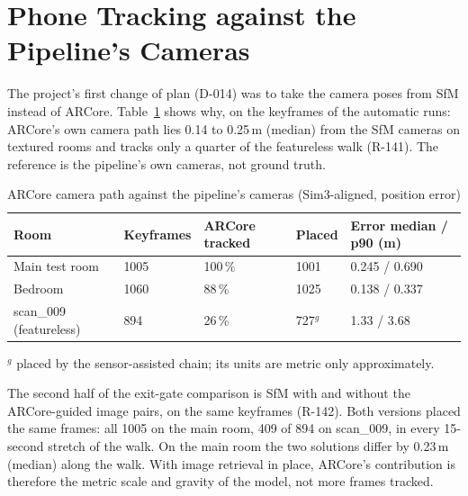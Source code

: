 \section{Phone Tracking against the Pipeline's Cameras}
\label{sec:eval-arcore}
The project's first change of plan (D-014) was to take the camera poses from SfM instead of ARCore. Table~\ref{tab:eval-arcore}
shows why, on the keyframes of the automatic runs: ARCore's own camera path lies 0.14 to 0.25\,m (median) from the
SfM cameras on textured rooms and tracks only a quarter of the featureless walk (R-141). The reference is the
pipeline's own cameras, not ground truth.
\begin{table}[htbp]
\centering\small
\caption{ARCore camera path against the pipeline's cameras (Sim3-aligned, position error)}
\label{tab:eval-arcore}
\begin{tabular}{p{3.4cm}p{1.6cm}p{2.2cm}p{1.8cm}p{3.4cm}}
\toprule
\textbf{Room} & \textbf{Keyframes} & \textbf{ARCore tracked} & \textbf{Placed} & \textbf{Error median / p90 (m)} \\
\midrule
Main test room & 1005 & 100\,\% & 1001 & 0.245 / 0.690 \\
Bedroom & 1060 & 88\,\% & 1025 & 0.138 / 0.337 \\
scan\_009 (featureless) & 894 & 26\,\% & 727$^g$ & 1.33 / 3.68 \\
\bottomrule
\end{tabular}

\smallskip
\footnotesize $^g$ placed by the sensor-assisted chain; its units are metric only approximately.
\end{table}
The second half of the exit-gate comparison is SfM with and without the ARCore-guided image pairs, on the same
keyframes (R-142). Both versions placed the same frames: all 1005 on the main room, 409 of 894 on scan\_009, in every
15-second stretch of the walk. On the main room the two solutions differ by 0.23\,m (median) along the walk. With image
retrieval in place, ARCore's contribution is therefore the metric scale and gravity of the model, not more frames
tracked.

